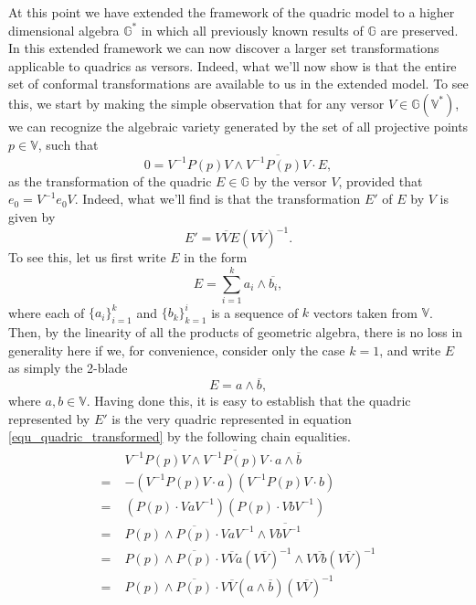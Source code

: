 \documentclass{birkjour}
\theoremstyle{definition}
\theoremstyle{remark}
\numberwithin{equation}{section}
\newcommand{\G}{\mathbb{G}}
\newcommand{\V}{\mathbb{V}}
\begin{document}
At this point we have extended the framework of the quadric model to a higher dimensional
algebra $\G^*$ in which all previously known results of $\G$ are preserved.  In this extended framework
we can now discover a larger set transformations applicable to quadrics as versors.  Indeed, what
we'll now show is that the entire set of conformal transformations are available to us in the extended model.
To see this, we start by making the simple observation that for any versor $V\in\G(\V^*)$, we can
recognize the algebraic variety generated by the set of all projective points $p\in\V$, such that
\begin{equation}\label{equ_quadric_transformed}
0 = V^{-1}P(p)V\wedge\overline{V^{-1}P(p)V}\cdot E,
\end{equation}
as the transformation of the quadric $E\in\G$ by the versor $V$, provided
that $e_0=V^{-1}e_0V$.  Indeed, what we'll find
is that the transformation $E'$ of $E$ by $V$ is given by
\begin{equation}
E' = V\overline{V}E(V\overline{V})^{-1}.
\end{equation}
To see this, let us first write $E$ in the form
\begin{equation}
E = \sum_{i=1}^k a_i\wedge\overline{b_i},
\end{equation}
where each of $\{a_i\}_{i=1}^k$ and $\{b_k\}_{k=1}^i$ is a sequence of $k$ vectors taken from $\V$.
Then, by the linearity of all the products of geometric algebra, there is no loss in generality here
if we, for convenience, consider only the case $k=1$, and write $E$ as simply the 2-blade
\begin{equation}
E = a\wedge\overline{b},
\end{equation}
where $a,b\in\V$.  Having done this, it is easy to establish that the quadric represented by $E'$
is the very quadric represented in equation \eqref{equ_quadric_transformed} by the following chain equalities.
\begin{align}
 & V^{-1}P(p)V\wedge\overline{V^{-1}P(p)V}\cdot a\wedge\overline{b} \\
=\;& -(V^{-1}P(p)V\cdot a)(V^{-1}P(p)V\cdot b) \\
=\;& (P(p)\cdot VaV^{-1})(P(p)\cdot VbV^{-1}) \\
=\;& P(p)\wedge\overline{P(p)}\cdot VaV^{-1}\wedge\overline{VbV^{-1}} \\
=\;& P(p)\wedge\overline{P(p)}\cdot V\overline{V}a(V\overline{V})^{-1}\wedge V\overline{Vb}(V\overline{V})^{-1} \\
=\;& P(p)\wedge\overline{P(p)}\cdot V\overline{V}(a\wedge\overline{b})(V\overline{V})^{-1}
\end{align}
\end{document}

